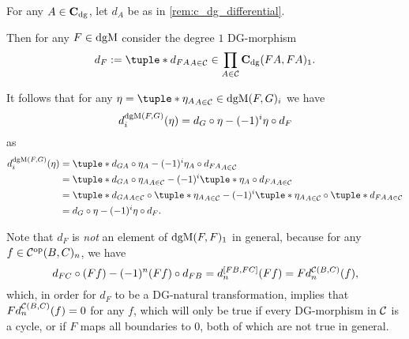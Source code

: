 \begin{remark}
    For any \( A \in \operatorname{\mathbf{C}}_{\operatorname{dg}} \), let \( d_A \) be as in \autoref{rem:c_dg_differential}.

    Then for any \( F \in \operatorname{dgM} \) consider the degree \( 1 \) DG-morphism
    \[
        d_F := \tuple*{d_{FA}}_{A \in \Cc} \in \prod_{A \in \Cc} \C_{\dg}(FA, FA)_1.
    \]

    It follows that for any \( \eta = \tuple*{\eta_A}_{A \in \Cc} \in \dgM(F, G)_i \) we have
    \[
        d_i^{\operatorname{dgM}(F, G)}(\eta) = d_G \circ \eta - (-1)^i \eta \circ d_F
    \]
    as
    \begin{align*}
        d_i^{\dgM(F, G)}(\eta) &= \tuple*{ d_{G A} \circ \eta_A - (-1)^i \eta_A \circ d_{F A} }_{A \in \Cc} \\
        &= \tuple*{ d_{G A} \circ \eta_A }_{A \in \Cc} - (-1)^i \tuple*{ \eta_A \circ d_{F A} }_{A \in \Cc} \\
        &= \tuple*{d_{G A}}_{A \in \Cc} \circ \tuple*{\eta_A}_{A \in \Cc} - (-1)^i \tuple*{\eta_A}_{A \in \Cc} \circ \tuple*{d_{F A}}_{A \in \Cc} \\
        &= d_G \circ \eta - (-1)^i \eta \circ d_F.
    \end{align*}
\end{remark}

Note that \( d_F \) is \emph{not} an element of \( \operatorname{dgM}(F, F)_1 \) in general, because for any \( f \in {\mathcal{C}}^{\operatorname{op}}(B, C)_n \), we have
\[
    d_{F C} \circ (F f) - (-1)^n (F f) \circ d_{F B} = d_n^{[F B, F C]}(F f) = F d_n^{{\mathcal{C}}(B, C)} (f),
\]
which, in order for \( d_F \) to be a DG-natural transformation, implies that \( F d_n^{{\mathcal{C}}(B, C)} (f) = 0 \) for any \( f \), which will only be true if every DG-morphism in \( {\mathcal{C}} \) is a cycle, or if \( F \) maps all boundaries to \( 0 \), both of which are not true in general.